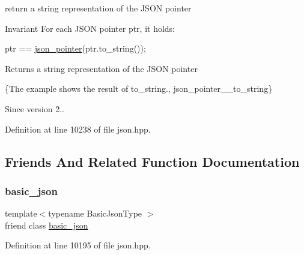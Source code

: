 return a string representation of the J\+S\+ON pointer 

\begin{DoxyInvariant}{Invariant}
For each J\+S\+ON pointer {\ttfamily ptr}, it holds\+: 
\begin{DoxyCode}
ptr == \hyperlink{classnlohmann_1_1json__pointer_a7f32d7c62841f0c4a6784cf741a6e4f8}{json\_pointer}(ptr.to\_string());
\end{DoxyCode}

\end{DoxyInvariant}
\begin{DoxyReturn}{Returns}
a string representation of the J\+S\+ON pointer
\end{DoxyReturn}
\{The example shows the result of {\ttfamily to\+\_\+string}., json\+\_\+pointer\+\_\+\+\_\+to\+\_\+string\}

\begin{DoxySince}{Since}
version 2.. 
\end{DoxySince}


Definition at line 10238 of file json.\+hpp.



\subsection{Friends And Related Function Documentation}
\mbox{\label{classnlohmann_1_1json__pointer_ada3100cdb8700566051828f1355fa745}} 
\subsubsection{\texorpdfstring{basic\+\_\+json}{basic\_json}}
{\footnotesize\ttfamily template$<$typename Basic\+Json\+Type $>$ \\
friend class \hyperlink{classnlohmann_1_1basic__json}{basic\+\_\+json}\hspace{0.3cm}{\ttfamily [friend]}}



Definition at line 10195 of file json.\+hpp.

\mbox{\label{classnlohmann_1_1json__pointer_a6779edcf28e6f018a3bbb29c0b4b5e1e}} 
